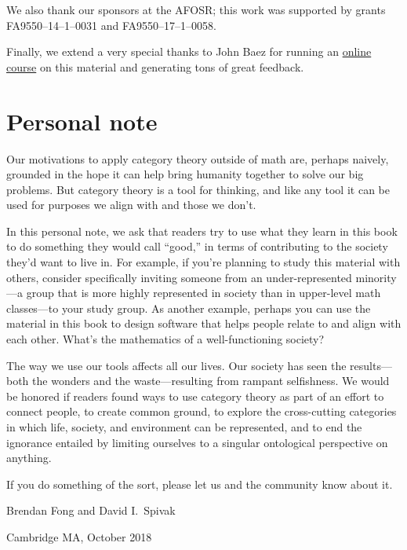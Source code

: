 \documentclass[7Sketches]{subfiles}
\begin{document}
We also thank our sponsors at the AFOSR; this work was supported by grants
FA9550--14--1--0031 and FA9550--17--1--0058.

Finally, we extend a very special thanks to John Baez for running an
\href{https://forum.azimuthproject.org/categories/applied-category-theory-course}{online
course} on this material and generating tons of great feedback.


\section*{Personal note}

Our motivations to apply category theory outside of math are, perhaps naively,
grounded in the hope it can help bring humanity together to solve our big
problems. But category theory is a tool for thinking, and like any tool it can
be used for purposes we align with and those we don't. 

In this personal note, we ask that readers try to use what they learn in this
book to do something they would call ``good,'' in terms of contributing to the
society they'd want to live in. For example, if you're planning to study this
material with others, consider specifically inviting someone from an
under-represented minority---a group that is more highly represented in society
than in upper-level math classes---to your study group. As another example,
perhaps you can use the material in this book to design software that helps
people relate to and align with each other. What's the mathematics of a
well-functioning society?

The way we use our tools affects all our lives. Our society has seen the
results---both the wonders and the waste---resulting from rampant selfishness.
We would be honored if readers found ways to use category theory as part of an
effort to connect people, to create common ground, to explore the cross-cutting
categories in which life, society, and environment can be represented, and to end the
ignorance entailed by limiting ourselves to a singular ontological perspective
on anything.

If you do something of the sort, please let us and the community know about it.
\vspace{1cm}


\flushright
Brendan Fong and David I.\ Spivak

Cambridge MA, October 2018


%
\end{document}

